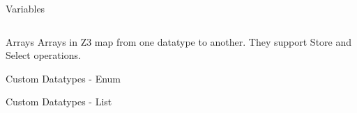 \documentclass{beamer}
\begin{document}
\begin{frame}{Variables}
	
\begin{columns}
	\begin{column}{0.4\textwidth}
			
	\end{column}
	\begin{column}{0.6\textwidth}
			
		
	\end{column}
	
\end{columns}


\end{frame}

\begin{frame}{Arrays}
	Arrays in Z3 map from one datatype to another. They support Store and Select operations.
	
	
\end{frame}

\begin{frame}{Custom Datatypes - Enum}
	
\end{frame}


\begin{frame}{Custom Datatypes - List}
	
\end{frame}
\end{document}
